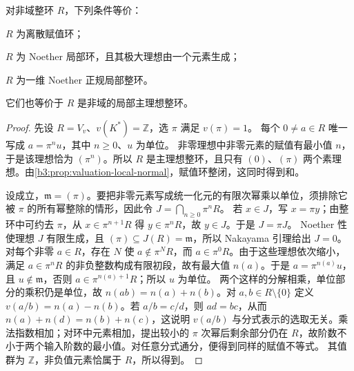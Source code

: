 \begin{theorem}\label{b3:thm:dvr-characterizations}
	对非域整环 \(R\)，下列条件等价：
	\begin{equivalences}
		\item\label{b3:item:dvr-valuation} \(R\) 为离散赋值环；
		\item\label{b3:item:dvr-principal-maximal} \(R\) 为 Noether 局部环，且其极大理想由一个元素生成；
		\item\label{b3:item:dvr-normal-dimension-one} \(R\) 为一维 Noether 正规局部整环。
	\end{equivalences}
	它们也等价于 \(R\) 是非域的局部主理想整环。
\end{theorem}
\begin{proof}
	先设 \(R=V_v\)、\(v(K^*)=\mathbb Z\)，选 \(\pi\) 满足 \(v(\pi)=1\)。 每个 \(0\ne a\in R\) 唯一写成 \(a=\pi^nu\)，其中 \(n\ge0\)、\(u\) 为单位。 非零理想中非零元素的赋值有最小值 \(n\)，于是该理想恰为 \((\pi^n)\)。所以 \(R\) 是主理想整环，且只有 \((0)\)、\((\pi)\) 两个素理想。由\cref{b3:prop:valuation-local-normal}，赋值环整闭，这同时得到和。

	设成立，\(\mathfrak m=(\pi)\)。要把非零元素写成统一化元的有限次幂乘以单位，须排除它被 \(\pi\) 的所有幂整除的情形，因此令 \(J=\bigcap_{n\ge0}\pi^nR\)。 若 \(x\in J\)，写 \(x=\pi y\)；由整环中可约去 \(\pi\)，从 \(x\in\pi^{n+1}R\) 得 \(y\in\pi^nR\)，故 \(y\in J\)。于是 \(J=\pi J\)。 Noether 性使理想 \(J\) 有限生成，且 \((\pi)\subseteq J(R)=\mathfrak m\)，所以 Nakayama 引理给出 \(J=0\)。对每个非零 \(a\in R\)，存在 \(N\) 使 \(a\notin\pi^NR\)，而 \(a\in\pi^0R\)。由于这些理想依次缩小，满足 \(a\in\pi^nR\) 的非负整数构成有限初段，故有最大值 \(n(a)\)。于是 \(a=\pi^{n(a)}u\)，且 \(u\notin\mathfrak m\)，否则 \(a\in\pi^{n(a)+1}R\)；所以 \(u\) 为单位。 两个这样的分解相乘，单位部分的乘积仍是单位，故 \(n(ab)=n(a)+n(b)\)。对 \(a,b\in R\setminus\{0\}\) 定义 \(v(a/b)=n(a)-n(b)\)。若 \(a/b=c/d\)，则 \(ad=bc\)，从而 \(n(a)+n(d)=n(b)+n(c)\)，这说明 \(v(a/b)\) 与分式表示的选取无关。乘法指数相加；对环中元素相加，提出较小的 \(\pi\) 次幂后剩余部分仍在 \(R\)，故阶数不小于两个输入阶数的最小值。对任意分式通分，便得到同样的赋值不等式。 其值群为 \(\mathbb Z\)，非负值元素恰属于 \(R\)，所以得到。


\end{proof}
